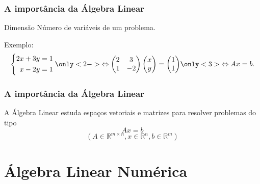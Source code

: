 \documentclass{beamer}
\begin{document}
\begin{darkframes}
  \begin{frame}
    \frametitle{A importância da Álgebra Linear}
    \begin{block}{Dimensão}
      Número de variáveis de um problema.
    \end{block}
    \vfill
    Exemplo:
    \begin{equation*}
      \left\{ \begin{aligned}
          2x+3y &= 1\\
          x-2y &= 1
        \end{aligned}\right.
      \only<2->{\Leftrightarrow
        \begin{pmatrix}
          2 & 3\\
          1 & -2
        \end{pmatrix}
        \begin{pmatrix} x\\y\end{pmatrix}
        = \begin{pmatrix}1\\1\end{pmatrix}}
      \only<3>{\Leftrightarrow Ax=b.}
    \end{equation*}
  \end{frame}
  
  \begin{frame}
    \frametitle{A importância da Álgebra Linear}
    A Álgebra Linear estuda espaços vetoriais e matrizes para resolver problemas do tipo
    $$Ax=b$$
    $$(A\in {\mathbb{R}}^{m\times n}, x\in {\mathbb{R}}^n, b \in {\mathbb{R}}^m)$$
    \vfill
  \end{frame}
  
  \section{Álgebra Linear Numérica}
  

\end{darkframes}
\end{document}
